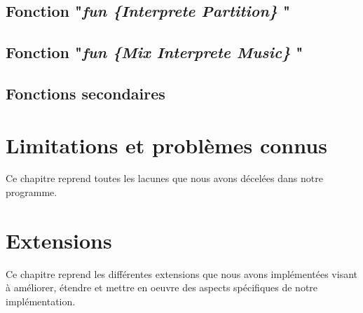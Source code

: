 \documentclass[12pt, a4paper]{report}
\begin{document}
\section{Fonction "\textit{fun \{Interprete Partition\} }"}


\section{Fonction "\textit{fun \{Mix Interprete Music\} }"}


\section{Fonctions secondaires}


\chapter{Limitations et problèmes connus}
	Ce chapitre reprend toutes les lacunes que nous avons décelées dans notre programme. 



\chapter{Extensions}
	Ce chapitre reprend les différentes extensions que nous avons implémentées visant à améliorer, étendre et mettre en oeuvre des aspects spécifiques de notre implémentation.
\end{document}
